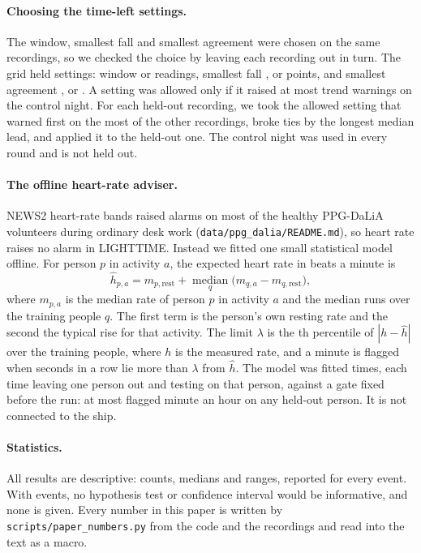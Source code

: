 \paragraph{Choosing the time-left settings.}
The window, smallest fall and smallest agreement were chosen on the same \numUwEvents{} recordings, so we checked the choice by leaving each recording out in turn. The grid held \numGridSize{} settings: window \numGridWindowShort{} or \numGridWindowLong{} readings, smallest fall \numGridDropLow, \numMinDrop{} or \numGridDropHigh{} points, and smallest agreement \numGridAgreeLow, \numMinAgreement{} or \numGridAgreeHigh. A setting was allowed only if it raised at most \numGridMaxControlWarnings{} trend warnings on the control night. For each held-out recording, we took the allowed setting that warned first on the most of the other recordings, broke ties by the longest median lead, and applied it to the held-out one. The control night was used in every round and is not held out.

\paragraph{The offline heart-rate adviser.}
NEWS2 heart-rate bands raised alarms on most of the healthy PPG-DaLiA volunteers during ordinary desk work (\nolinkurl{data/ppg_dalia/README.md}), so heart rate raises no alarm in LIGHTTIME. Instead we fitted one small statistical model offline. For person $p$ in activity $a$, the expected heart rate in beats a minute is
\begin{equation}\label{eq:hr}
  \hat h_{p,a} = m_{p,\text{rest}} + \operatorname*{median}_{q}\bigl(m_{q,a} - m_{q,\text{rest}}\bigr),
\end{equation}
where $m_{p,a}$ is the median rate of person $p$ in activity $a$ and the median runs over the training people $q$. The first term is the person's own resting rate and the second the typical rise for that activity. The limit $\lambda$ is the \numHrLimitPercentile th percentile of $|h - \hat h|$ over the training people, where $h$ is the measured rate, and a minute is flagged when \numHrSustainS{} seconds in a row lie more than $\lambda$ from $\hat h$. The model was fitted \numHrPeople{} times, each time leaving one person out and testing on that person, against a gate fixed before the run: at most \numHrGateMinPerH{} flagged minute an hour on any held-out person. It is not connected to the ship.

\paragraph{Statistics.}
All results are descriptive: counts, medians and ranges, reported for every event. With \numUwEvents{} events, no hypothesis test or confidence interval would be informative, and none is given. Every number in this paper is written by \texttt{scripts/paper\_numbers.py} from the code and the recordings and read into the text as a macro.
